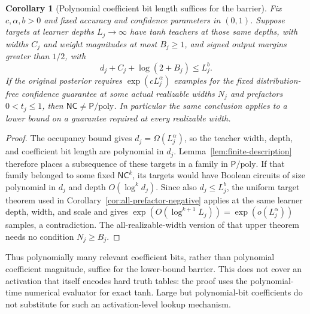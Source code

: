 \documentclass[11pt]{article}
\newtheorem{corollary}[theorem]{Corollary}
\theoremstyle{remark}
\newcommand{\NC}{\mathsf{NC}}
\newcommand{\Ppoly}{\mathsf{P}/\mathrm{poly}}
\begin{document}
\begin{corollary}[Polynomial coefficient bit length suffices for the barrier]
\label{cor:bitlength-negative}
Fix $c,\alpha,b>0$ and fixed accuracy and confidence parameters
in $(0,1)$. Suppose targets at learner depths $L_j\to\infty$
have tanh teachers at those same depths, with widths $C_j$ and weight magnitudes at most
$B_j\ge1$, and signed output margins greater than $1/2$, with
\[
 d_j+C_j+\log(2+B_j)\le L_j^b.
\]
If the original posterior requires $\exp(cL_j^\alpha)$ examples
for the fixed distribution-free confidence guarantee at some
actual realizable widths $N_j$ and prefactors $0<t_j\le1$, then
$\NC\ne\Ppoly$. In particular the same conclusion applies to a
lower bound on a guarantee required at every realizable width.
\end{corollary}
\begin{proof}
The occupancy bound gives $d_j=\Omega(L_j^\alpha)$, so the teacher
width, depth, and coefficient bit length are polynomial in $d_j$.
Lemma~\ref{lem:finite-description} therefore places a subsequence
of these targets in a family in $\Ppoly$. If that family belonged
to some fixed $\NC^k$, its targets would have Boolean circuits of
size polynomial in $d_j$ and depth $O(\log^k d_j)$. Since also
$d_j\le L_j^b$, the uniform target theorem used in
Corollary~\ref{cor:all-prefactor-negative} applies at the same
learner depth, width, and scale and gives
$\exp(O(\log^{k+1}L_j))=\exp(o(L_j^\alpha))$ samples, a
contradiction. The all-realizable-width version of that upper
theorem needs no condition $N_j\ge B_j$.
\end{proof}

Thus polynomially many relevant coefficient bits, rather than
polynomial coefficient magnitude, suffice for the lower-bound
barrier. This does not cover an activation that itself encodes
hard truth tables: the proof uses the polynomial-time numerical
evaluator for exact tanh. Large but polynomial-bit coefficients
do not substitute for such an activation-level lookup mechanism.
\end{document}
